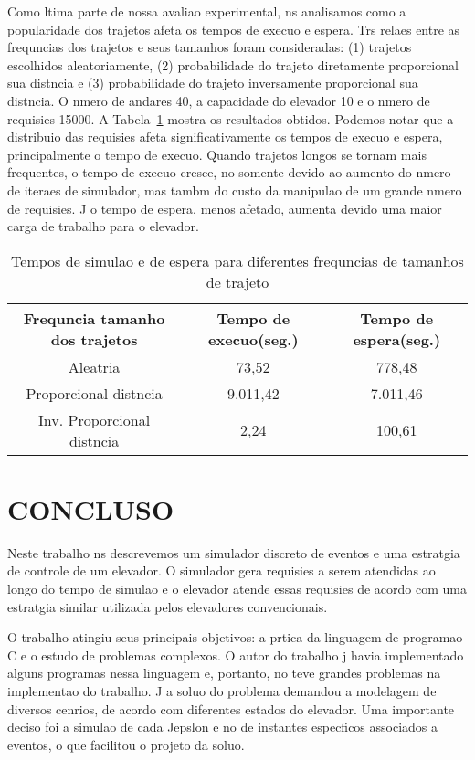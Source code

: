 \documentclass[12pt]{article}
\begin{document}
Como ltima parte de nossa avaliao experimental, ns analisamos como a popularidade dos trajetos afeta os tempos de execuo e espera. Trs relaes entre as frequncias dos trajetos e seus tamanhos foram consideradas: (1) trajetos escolhidos aleatoriamente, (2) probabilidade do trajeto diretamente proporcional  sua distncia e (3) probabilidade do trajeto inversamente proporcional  sua distncia. O nmero de andares  40, a capacidade do elevador  10 e o nmero de requisies  15000. A Tabela~\ref{tempos_freq_trajetos} mostra os resultados obtidos. Podemos notar que a distribuio das requisies afeta significativamente os tempos de execuo e espera, principalmente o tempo de execuo. Quando trajetos longos se tornam mais frequentes, o tempo de execuo cresce, no somente devido ao aumento do nmero de iteraes de simulador, mas tambm do custo da manipulao de um grande nmero de requisies. J o tempo de espera, menos afetado, aumenta devido  uma maior carga de trabalho para o elevador.

\begin{table}[ht!]
\centering
\begin{footnotesize}
\begin{tabular}{|c|c|c|}
\hline
\textbf{Frequncia tamanho dos trajetos}              & \textbf{Tempo de execuo(seg.)}      & \textbf{Tempo de espera(seg.)} \\ \hline
Aleatria			& 73,52	& 778,48	\\ \hline
Proporcional  distncia	& 9.011,42	& 7.011,46	\\ \hline
Inv. Proporcional  distncia	& 2,24	& 100,61	\\ \hline
\end{tabular}
\end{footnotesize}
\caption{Tempos de simulao e de espera para diferentes frequncias de tamanhos de trajeto \label{tempos_freq_trajetos}}
\end{table}

\section{CONCLUSO}
\label{conclusao}

Neste trabalho ns descrevemos um simulador discreto de eventos e uma estratgia de controle de um elevador. O simulador gera requisies a serem atendidas ao longo do tempo de simulao e o elevador atende  essas requisies de acordo com uma estratgia similar  utilizada pelos elevadores convencionais.

O trabalho atingiu seus principais objetivos: a prtica da linguagem de programao C e o estudo de problemas complexos. O autor do trabalho j havia implementado alguns programas nessa linguagem e, portanto, no teve grandes problemas na implementao do trabalho. J a soluo do problema demandou a modelagem de diversos cenrios, de acordo com diferentes estados do elevador. Uma importante deciso foi a simulao de cada Jepslon e no de instantes especficos associados a eventos, o que facilitou o projeto da soluo.
\end{document}
